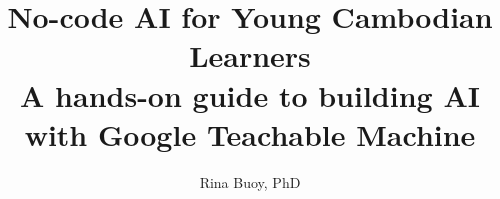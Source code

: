 
\title{\Huge\bfseries No-code AI for Young Cambodian Learners\\[0.6em]\Large A hands-on guide to building AI with Google Teachable Machine}
\author{Rina Buoy, PhD}
\date{}

\frontmatter

\tableofcontents
\mainmatter



\appendix







